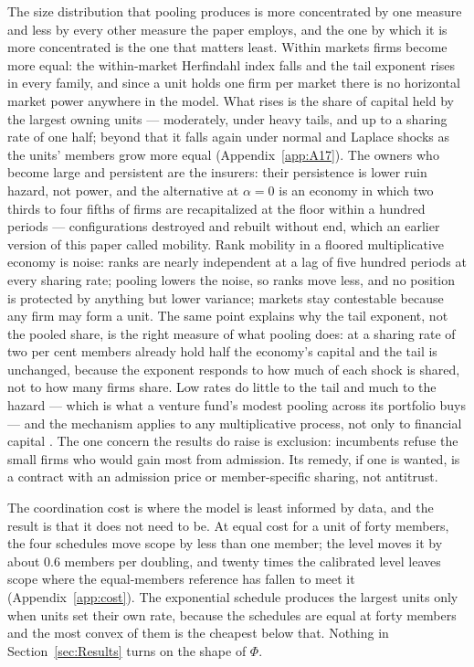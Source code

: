 The size distribution that pooling produces is more concentrated by one measure and less by every other measure the paper employs, and the one by which it is more concentrated is the one that matters least. Within markets firms become more equal: the within-market Herfindahl index falls and the tail exponent rises in every family, and since a unit holds one firm per market there is no horizontal market power anywhere in the model. What rises is the share of capital held by the largest owning units --- moderately, under heavy tails, and up to a sharing rate of one half; beyond that it falls again under normal and Laplace shocks as the units' members grow more equal (Appendix~\ref{app:A17}). The owners who become large and persistent are the insurers: their persistence is lower ruin hazard, not power, and the alternative at $\alpha = 0$ is an economy in which two thirds to four fifths of firms are recapitalized at the floor within a hundred periods --- configurations destroyed and rebuilt without end, which an earlier version of this paper called mobility. Rank mobility in a floored multiplicative economy is noise: ranks are nearly independent at a lag of five hundred periods at every sharing rate; pooling lowers the noise, so ranks move less, and no position is protected by anything but lower variance; markets stay contestable because any firm may form a unit. The same point explains why the tail exponent, not the pooled share, is the right measure of what pooling does: at a sharing rate of two per cent members already hold half the economy's capital and the tail is unchanged, because the exponent responds to how much of each shock is shared, not to how many firms share. Low rates do little to the tail and much to the hazard --- which is what a venture fund's modest pooling across its portfolio buys \parencite{boyd2023ergodic} --- and the mechanism applies to any multiplicative process, not only to financial capital \parencite{pietronero2001explaining, sibani2020human}. The one concern the results do raise is exclusion: incumbents refuse the small firms who would gain most from admission. Its remedy, if one is wanted, is a contract with an admission price or member-specific sharing, not antitrust.

The coordination cost is where the model is least informed by data, and the result is that it does not need to be. At equal cost for a unit of forty members, the four schedules move scope by less than one member; the level moves it by about 0.6 members per doubling, and twenty times the calibrated level leaves scope where the equal-members reference has fallen to meet it (Appendix~\ref{app:cost}). The exponential schedule produces the largest units only when units set their own rate, because the schedules are equal at forty members and the most convex of them is the cheapest below that. Nothing in Section~\ref{sec:Results} turns on the shape of $\Phi$.

